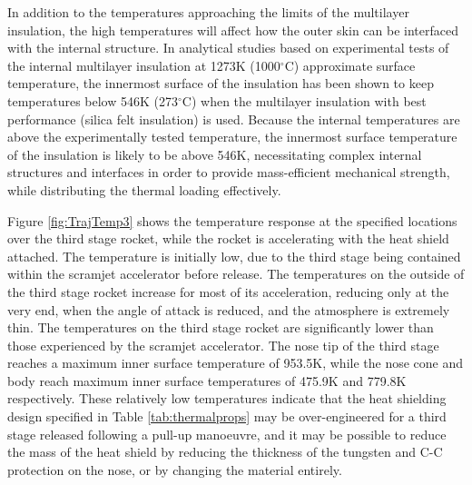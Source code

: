 In addition to the temperatures approaching the limits of the multilayer insulation, the high temperatures will affect how the outer skin can be interfaced with the internal structure. 
In analytical studies based on experimental tests of the internal multilayer insulation at 1273K (1000$^\circ$C) approximate surface temperature, the innermost surface of the insulation has been shown to keep temperatures below 546K (273$^\circ$C)\cite{Kourtides} when the multilayer insulation with best performance (silica felt insulation\cite{Kourtides}) is used. Because the internal temperatures are above the experimentally tested temperature, the innermost surface temperature of the insulation is likely to be above 546K, necessitating complex internal structures and interfaces in order to provide mass-efficient mechanical strength, while distributing the thermal loading effectively.


Figure \ref{fig:TrajTemp3} shows the temperature response at the specified locations over the third stage rocket, while the rocket is accelerating with the heat shield attached. The temperature is initially low, due to the third stage being contained within the scramjet accelerator before release. The temperatures on the outside of the third stage rocket increase for most of its acceleration, reducing only at the very end, when the angle of attack is reduced, and the atmosphere is extremely thin. 
The temperatures on the third stage rocket are significantly lower than those experienced by the scramjet accelerator. The nose tip of the third stage reaches a maximum inner surface temperature of 953.5K, while the nose cone and body reach maximum inner surface temperatures of 475.9K and 779.8K respectively. These relatively low temperatures indicate that the heat shielding design specified in Table \ref{tab:thermalprops} may be over-engineered for a third stage released following a pull-up manoeuvre, and it may be possible to reduce the mass of the heat shield by reducing the thickness of the tungsten and C-C protection on the nose, or by changing the material entirely. 









